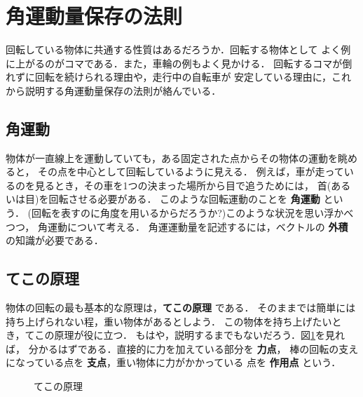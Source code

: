     \section{角運動量保存の法則}
        \begin{mycomment}
            回転している物体に共通する性質はあるだろうか．回転する物体として
            よく例に上がるのがコマである．また，車輪の例もよく見かける．
            回転するコマが倒れずに回転を続けられる理由や，走行中の自転車が
            安定している理由に，これから説明する角運動量保存の法則が絡んでいる．
        \end{mycomment}

        \subsection{角運動}
            物体が一直線上を運動していても，ある固定された点からその物体の運動を眺めると，
            その点を中心として回転しているように見える．
            例えば，車が走っているのを見るとき，その車を1つの決まった場所から目で追うためには，
            首(あるいは目)を回転させる必要がある．
            このような回転運動のことを \textbf{角運動} という．
            (回転を表すのに角度を用いるからだろうか?)このような状況を思い浮かべつつ，
            角運動について考える．
            角運運動量を記述するには，ベクトルの \textbf{外積} の知識が必要である．

        \subsection{てこの原理}
            物体の回転の最も基本的な原理は，\textbf{てこの原理} である．
            そのままでは簡単には持ち上げられない程，重い物体があるとしよう．
            この物体を持ち上げたいとき，てこの原理が役に立つ．
            もはや，説明するまでもないだろう．図\ref{fig:teko_no_genri1}を見れば，
            分かるはずである．直接的に力を加えている部分を \textbf{力点}，
            棒の回転の支えになっている点を \textbf{支点}，重い物体に力がかかっている
            点を \textbf{作用点} という．
                    \begin{figure}[hbt]
                        \begin{center}
                            \caption{てこの原理}
                            \label{fig:teko_no_genri1}
                        \end{center}
                    \end{figure}

